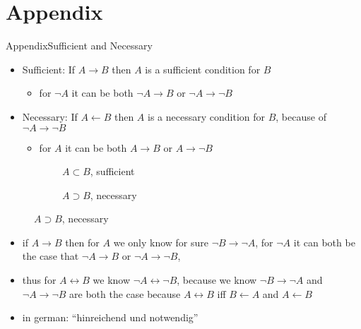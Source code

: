 
\section{Appendix}

\begin{frame}[allowframebreaks]{Appendix}{Sufficient and Necessary}
  \begin{itemize}
    \item \alert{Sufficient:} If $A\rightarrow B$ then $A$ is a sufficient condition for $B$
      \begin{itemize}
        \item for $\neg A$ it can be both $\neg A \rightarrow B$ or $\neg A \rightarrow \neg B$
      \end{itemize}
    \item \alert{Necessary:} If $A\leftarrow B$ then $A$ is a necessary condition for $B$, because of $\neg A \rightarrow \neg B$
      \begin{itemize}
        \item for $A$ it can be both $A \rightarrow B$ or $A \rightarrow \neg B$
      \end{itemize}
  \end{itemize}
  \begin{figure}
    \begin{subfigure}[t]{0.4\textwidth}
        \caption{$A \subset B$, sufficient}
    \end{subfigure}
    \begin{subfigure}[t]{0.4\textwidth}
      \caption{$A \supset B$, necessary}
    \end{subfigure}
  \end{figure}
  \begin{Sidenote}
    \begin{itemize}
      \item if $A\rightarrow B$ then for $A$ we \alert{only} know for sure $\neg B\rightarrow \neg A$, for $\neg A$ it can \alert{both} be the case that $\neg A\rightarrow B$ or $\neg A\rightarrow \neg B$,
      \item thus for $A\leftrightarrow B$ we know $\neg A\leftrightarrow \neg B$, because we know $\neg B\rightarrow \neg A$ and $\neg A\rightarrow \neg B$ are both the case because $A\leftrightarrow B$ \alert{iff} $B\leftarrow A$ and $A\leftarrow B$
      \item in \alert{german}: \enquote{hinreichend und notwendig}
    \end{itemize}
  \end{Sidenote}
\end{frame}

